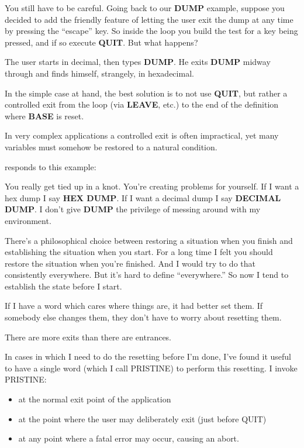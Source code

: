 You still have to be careful. Going back to our \textbf{DUMP} example, suppose
you decided to add the friendly feature of letting the user exit the
dump at any time by pressing the ``escape'' key. So inside the loop you
build the test for a key being pressed, and if so execute \textbf{QUIT}. But what
happens?

The user starts in decimal, then types \textbf{DUMP}. He exits \textbf{DUMP} midway
through and finds himself, strangely, in hexadecimal.

In the simple case at hand, the best solution is to not use
\textbf{QUIT}, but rather a controlled exit from the loop (via
\textbf{LEAVE}, etc.) to the end of the definition where
\textbf{BASE} is reset.

In very complex applications a controlled exit is often impractical,
yet many variables must somehow be restored to a natural condition.

\begin{interview}
 responds to this example:

\begin{tfquot}
You really get tied up in a knot. You're creating problems for yourself. If I
want a hex dump I say \textbf{HEX DUMP}. If I want a decimal dump I say
\textbf{DECIMAL DUMP}. I don't give \textbf{DUMP} the privilege of messing around
with my environment.

There's a philosophical choice between restoring a situation when you
finish and establishing the situation when you start. For a long time I felt
you should restore the situation when you're finished. And I would try to
do that consistently everywhere. But it's hard to define ``everywhere.'' So
now I tend to establish the state before I start.

If I have a word which cares where things are, it had better set them. If
somebody else changes them, they don't have to worry about resetting
them.

There are more exits than there are entrances.
\end{tfquot}
\end{interview}

In cases in which I need to do the resetting before I'm done, I've found it
useful to have a single word (which I call PRISTINE) to perform this
resetting. I invoke PRISTINE:

\begin{itemize}
\item at the normal exit point of the application
\item at the point where the user may deliberately exit (just before QUIT)
\item at any point where a fatal error may occur, causing an abort.
\end{itemize}


